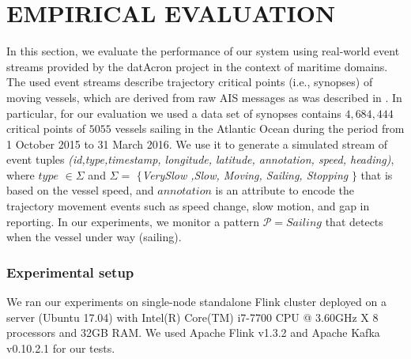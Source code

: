 \section{EMPIRICAL EVALUATION}
\label{sec:results}
In this section, we evaluate the performance of our system using real-world event streams provided by the datAcron project in the context of maritime domains. The used event streams describe trajectory critical points (i.e., synopses) of moving vessels, which are derived from raw AIS messages as was  described in \cite{synopses1}. In particular, for our evaluation we used a data set of synopses contains $4,684,444$ critical points of $5055$ vessels sailing in the Atlantic Ocean during the period from 1 October 2015 to 31 March 2016. We use it to generate a simulated stream of event tuples  \textit{(id,type,timestamp, longitude, latitude, annotation, speed, heading)},    where $type$ $\in \Sigma$ and $\Sigma=$ $\{$\textit{VerySlow ,Slow, Moving, Sailing, Stopping} $\}$ that is based on the  vessel speed, and $annotation$ is an attribute to encode the trajectory movement events such as speed change, slow motion, and gap in reporting. In our experiments, we monitor a pattern $\mathcal{P}=Sailing$ that detects when the vessel under way (sailing).


\subsubsection*{Experimental setup} We ran our experiments on single-node standalone Flink cluster deployed on a server (Ubuntu 17.04) with Intel(R) Core(TM) i7-7700 CPU @ 3.60GHz X 8 processors and 32GB RAM. We used Apache Flink v1.3.2 and Apache Kafka v0.10.2.1 for our tests.


